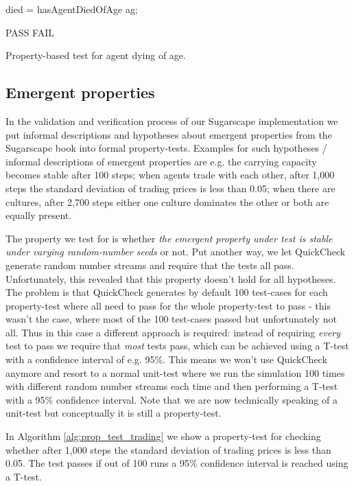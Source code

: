 \begin{algorithm}
died = hasAgentDiedOfAge ag;\

 {
  PASS\;
} {
  FAIL\;
}
\caption{Property-based test for agent dying of age.}
\label{alg:prop_test_agent}
\end{algorithm}

\subsection{Emergent properties}
In the validation and verification process of our Sugarscape implementation we put informal descriptions and hypotheses about emergent properties from the Sugarscape book into formal property-tests. Examples for such hypotheses / informal descriptions of emergent properties are e.g. the carrying capacity becomes stable after 100 steps; when agents trade with each other, after 1,000 steps the standard deviation of trading prices is less than 0.05; when there are cultures, after 2,700 steps either one culture dominates the other or both are equally present.

The property we test for is whether \textit{the emergent property under test is stable under varying random-number seeds} or not. Put another way, we let QuickCheck generate random number streams and require that the tests all pass. Unfortunately, this revealed that this property doesn't hold for all hypotheses. The problem is that QuickCheck generates by default 100 test-cases for each property-test where all need to pass for the whole property-test to pass - this wasn't the case, where most of the 100 test-cases passed but unfortunately not all. Thus in this case a different approach is required: instead of requiring \textit{every} test to pass we require that \textit{most} tests pass, which can be achieved using a T-test with a confidence interval of e.g. 95\%. This means we won't use QuickCheck anymore and resort to a normal unit-test where we run the simulation 100 times with different random number streams each time and then performing a T-test with a 95\% confidence interval. Note that we are now technically speaking of a unit-test but conceptually it is still a property-test.

In Algorithm \ref{alg:prop_test_trading} we show a property-test for checking whether after 1,000 steps the standard deviation of trading prices is less than 0.05. The test passes if out of 100 runs a 95\% confidence interval is reached using a T-test.

